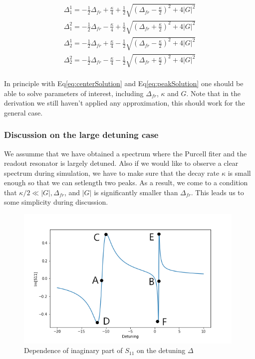 \begin{equation} \begin{split}
	\Delta_1^1 = -\frac{1}{2} \Delta_{fr} + \frac{\kappa}{4} + \frac{1}{2}\sqrt{\left(\Delta_{fr} - \frac{\kappa}{2}\right)^2 + 4|G|^2} \\
	\Delta_1^2 = -\frac{1}{2} \Delta_{fr} - \frac{\kappa}{4} + \frac{1}{2}\sqrt{\left(\Delta_{fr} + \frac{\kappa}{2}\right)^2 + 4|G|^2} \\
	\Delta_2^1 = -\frac{1}{2} \Delta_{fr} + \frac{\kappa}{4} - \frac{1}{2}\sqrt{\left(\Delta_{fr} - \frac{\kappa}{2}\right)^2 + 4|G|^2} \\
	\Delta_2^2 = -\frac{1}{2} \Delta_{fr} - \frac{\kappa}{4} - \frac{1}{2}\sqrt{\left(\Delta_{fr} + \frac{\kappa}{2}\right)^2 + 4|G|^2}
	\label{eq:peakSolution}
\end{split} \end{equation}
\\
In principle with Eq\ref{eq:centerSolution} and Eq\ref{eq:peakSolution} one should be able to solve parameters of interest, including $\Delta_{fr}$, $\kappa$ and $G$. Note that in the derivation we still haven't applied any approximation, this should work for the general case.

\subsubsection{Discussion on the large detuning case}

We assumme that we have obtained a spectrum where the Purcell fiter and the readout resonator is largely detuned. Also if we would like to observe a clear spectrum during simulation, we have to make sure that the decay rate $\kappa$ is small enough so that we can setlength two peaks. As a result, we come to a condition that $\kappa / 2 \ll |G|, \Delta_{fr}$, and $|G|$ is significantly smaller than $\Delta_{fr}$. This leads us to some simplicity during discussion. 

\begin{figure}[htbp]
     \centering
     \includegraphics[width=11cm]{pic/3D_cavity/3D_twoCavityResonance.jpg}
     \caption{Dependence of inaginary part of $S_{11}$ on the detuning $\Delta$}
     \label{fig:ImS11}
\end{figure}

